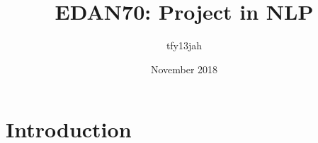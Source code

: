 \documentclass{article}
\title{EDAN70: Project in NLP}
\author{tfy13jah }
\date{November 2018}
\begin{document}
\maketitle

\section{Introduction}
\end{document}
